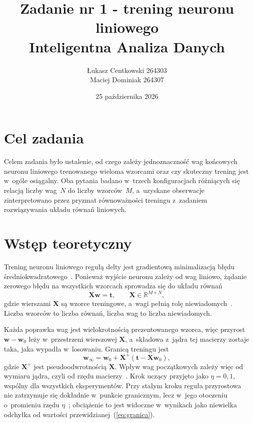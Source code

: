 \documentclass[12pt]{article}
\title{\textbf{Zadanie nr 1 - trening neuronu liniowego}\\[2mm]
       \large Inteligentna Analiza Danych}
\author{Łukasz Centkowski 264303 \\ Maciej Dominiak 264307}
\date{25 października 2026}
\begin{document}
\maketitle
\thispagestyle{empty}
\newpage

\section{Cel zadania}

Celem zadania było ustalenie, od czego zależy jednoznaczność wag końcowych
neuronu liniowego trenowanego wieloma wzorcami oraz czy skuteczny trening jest
w~ogóle osiągalny. Oba pytania badano w~trzech konfiguracjach różniących się
relacją liczby wag~$N$ do liczby wzorców~$M$, a~uzyskane obserwacje zinterpretowano
przez pryzmat równoważności treningu z~zadaniem rozwiązywania układu równań
liniowych.

\section{Wstęp teoretyczny}

Trening neuronu liniowego regułą delty jest gradientową minimalizacją błędu
średniokwadratowego~\cite{widrow}. Ponieważ wyjście neuronu zależy od wag liniowo,
żądanie zerowego błędu na wszystkich wzorcach sprowadza się do układu równań
\begin{equation}
\mathbf{X}\mathbf{w} = \mathbf{t}, \qquad \mathbf{X} \in \mathbb{R}^{M \times N},
\end{equation}
gdzie wierszami $\mathbf{X}$ są wzorce treningowe, a~wagi pełnią rolę
niewiadomych~\cite{wyklad}. Liczba wzorców to liczba równań, liczba wag to liczba
niewiadomych.

Każda poprawka wag jest wielokrotnością prezentowanego wzorca, więc przyrost
$\mathbf{w}-\mathbf{w}_0$ leży w~przestrzeni wierszowej $\mathbf{X}$, a~składowa
z~jądra tej macierzy zostaje taka, jaka wypadła w~losowaniu. Granicą treningu jest
\begin{equation}
\mathbf{w}_\infty = \mathbf{w}_0 + \mathbf{X}^{+}\left(\mathbf{t} - \mathbf{X}\mathbf{w}_0\right),
\label{eq:granica}
\end{equation}
gdzie $\mathbf{X}^{+}$ jest pseudoodwrotnością $\mathbf{X}$. Wpływ wag początkowych
zależy więc od wymiaru jądra, czyli od rzędu macierzy~\cite{osowski}. Krok uczący przyjęto jako $\eta = 0{,}1$, wspólny dla wszystkich eksperymentów.
Przy stałym kroku reguła przyrostowa nie zatrzymuje się dokładnie w~punkcie
granicznym, lecz w~jego otoczeniu o~promieniu rzędu $\eta$~\cite{widrow}; obciążenie
to jest widoczne w~wynikach jako niewielka odchyłka od wartości
przewidzianej~(\ref{eq:granica}).
\end{document}
